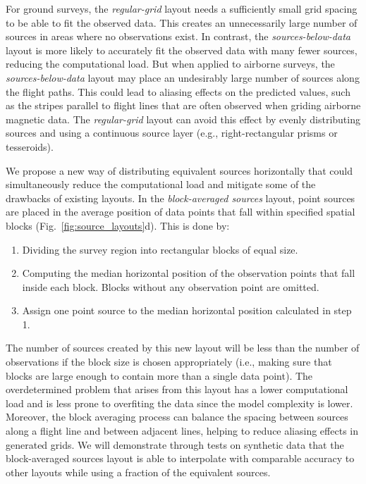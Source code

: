 \documentclass[twocolumn]{article}
\begin{document}
For ground surveys, the \emph{regular-grid} layout needs a sufficiently
small grid spacing to be able to fit the observed data.
This creates an unnecessarily large number of sources in areas where no
observations exist.
In contrast, the \emph{sources-below-data} layout is more likely to accurately
fit the observed data with many fewer sources, reducing the computational load.
But when applied to airborne surveys, the \emph{sources-below-data} layout may
place an undesirably large number of sources along the flight paths.
This could lead to aliasing effects on the predicted values, such as the
stripes parallel to flight lines that are often observed when griding airborne
magnetic data.
The \emph{regular-grid} layout can avoid this effect by evenly
distributing sources and using a continuous source layer (e.g.,
right-rectangular prisms or tesseroids).

We propose a new way of distributing equivalent sources horizontally that could
simultaneously reduce the computational load and mitigate some of the drawbacks
of existing layouts.
In the \emph{block-averaged sources} layout,
point sources are placed in the average
position of data points that fall within specified spatial blocks
(Fig.~\ref{fig:source_layouts}d).
This is done by:

\begin{enumerate}
    \item Dividing the survey region into rectangular blocks of equal size.
    \item Computing the median horizontal position of the observation points
      that fall inside each block. Blocks without any observation point are
      omitted.
    \item Assign one point source to the median horizontal position calculated
      in step 1.
\end{enumerate}

The number of sources created by this new layout will be less than the number
of observations if the block size is chosen appropriately (i.e., making sure
that blocks are large enough to contain more than a single data point).
The overdetermined problem that arises from this layout has a lower
computational load and is less prone to overfiting the data since the model
complexity is lower.
Moreover, the block averaging process can balance the spacing between sources
along a flight line and between adjacent lines, helping to reduce aliasing
effects in generated grids.
We will demonstrate through tests on synthetic data that the block-averaged sources
layout is able to interpolate with comparable accuracy to other layouts while
using a fraction of the equivalent sources.
\end{document}
